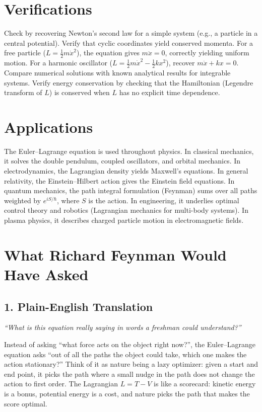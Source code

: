 \section*{Verifications}

Check by recovering Newton's second law for a simple system (e.g., a particle in a central potential). Verify that cyclic coordinates yield conserved momenta. For a free particle ($L = \frac{1}{2}m\dot{x}^2$), the equation gives $m\ddot{x} = 0$, correctly yielding uniform motion. For a harmonic oscillator ($L = \frac{1}{2}m\dot{x}^2 - \frac{1}{2}kx^2$), recover $m\ddot{x} + kx = 0$. Compare numerical solutions with known analytical results for integrable systems. Verify energy conservation by checking that the Hamiltonian (Legendre transform of $L$) is conserved when $L$ has no explicit time dependence.
\section*{Applications}

The Euler--Lagrange equation is used throughout physics. In classical mechanics, it solves the double pendulum, coupled oscillators, and orbital mechanics. In electrodynamics, the Lagrangian density yields Maxwell's equations. In general relativity, the Einstein--Hilbert action gives the Einstein field equations. In quantum mechanics, the path integral formulation (Feynman) sums over all paths weighted by $e^{iS/\hbar}$, where $S$ is the action. In engineering, it underlies optimal control theory and robotics (Lagrangian mechanics for multi-body systems). In plasma physics, it describes charged particle motion in electromagnetic fields.
\section*{What Richard Feynman Would Have Asked}

\subsection*{1. Plain-English Translation}
\textit{``What is this equation really saying in words a freshman could understand?''}

Instead of asking ``what force acts on the object right now?'', the Euler--Lagrange equation asks ``out of all the paths the object could take, which one makes the action stationary?'' Think of it as nature being a lazy optimizer: given a start and end point, it picks the path where a small nudge in the path does not change the action to first order. The Lagrangian $L = T - V$ is like a scorecard: kinetic energy is a bonus, potential energy is a cost, and nature picks the path that makes the score optimal.

